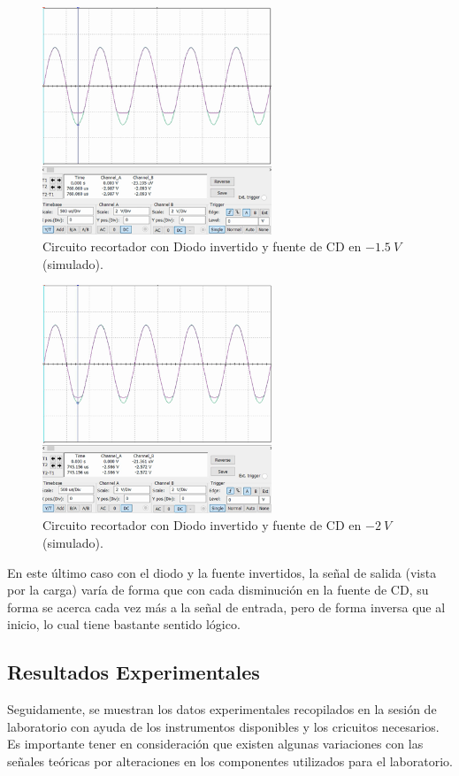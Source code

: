 \documentclass[journal]{IEEEtran}
\begin{document}
\begin{figure}[H]
        \centering
        \includegraphics[width=2.7in]{SignalSimulated_18.png}
        \caption{Circuito recortador con Diodo invertido y fuente de CD en $-1.5~V$ (simulado).}
        \label{fig:SignalSimulated_18}
\end{figure}
\begin{figure}[H]
        \centering
        \includegraphics[width=2.7in]{SignalSimulated_19.png}
        \caption{Circuito recortador con Diodo invertido y fuente de CD en $-2~V$ (simulado).}
        \label{fig:SignalSimulated_19}
\end{figure}

En este último caso con el diodo y la fuente invertidos, la señal de salida (vista por la carga) varía de forma que con cada disminución en la fuente de CD, su forma 
se acerca cada vez más a la señal de entrada, pero de forma inversa que al inicio, lo cual tiene bastante sentido lógico. 


\subsection{Resultados Experimentales}

Seguidamente, se muestran los datos experimentales recopilados en la sesión de laboratorio con ayuda de los instrumentos disponibles y los cricuitos necesarios.
Es importante tener en consideración que existen algunas variaciones con las señales teóricas por alteraciones en los componentes utilizados para el laboratorio.
\end{document}
